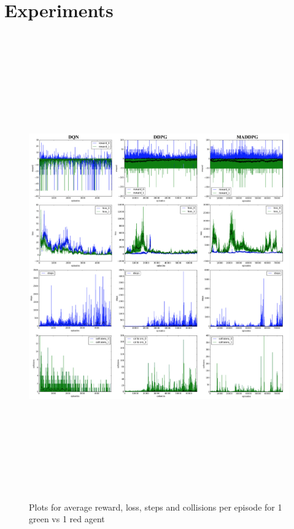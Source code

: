 
\section{Experiments}
\label{sec:experiment}

\begin{figure}[htbp]
    \vspace*{-3.5cm}
    \hspace*{-3.5cm} 
    \includegraphics[width=21cm, height=20cm]{1vs1}
	\caption{Plots for average reward, loss, steps and collisions per episode for 1 green vs 1 red agent}\label{Figure 2}
\end{figure}

